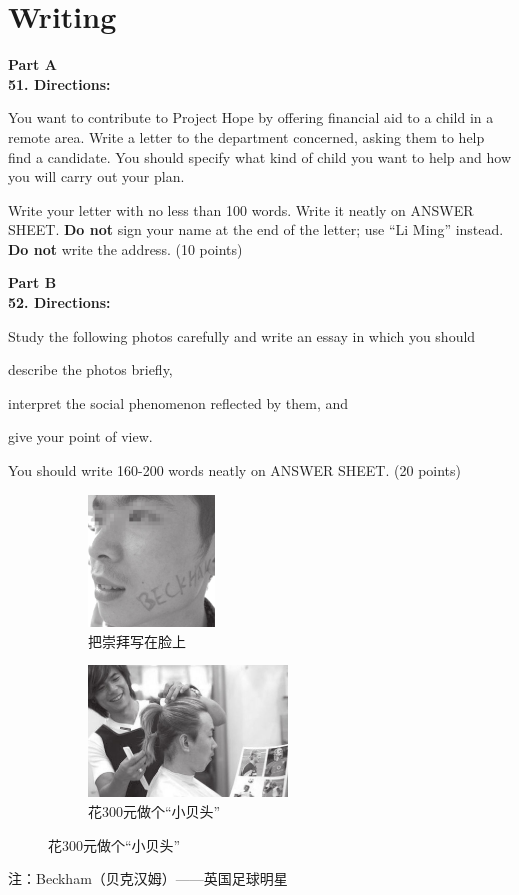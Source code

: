 \newpage
\section{Writing}


\noindent
\textbf{Part A}\\
\textbf{51. Directions:}

You want to contribute to Project Hope by offering financial aid to a
child in a remote area. Write a letter to the department concerned,
asking them to help find a candidate. You should specify what kind of
child you want to help and how you will carry out your plan.

Write your letter with no less than 100 words. Write it neatly on ANSWER
SHEET.
\textbf{Do not} sign your name at the end of the letter; use ``Li Ming''
instead.
\textbf{Do not} write the address. (10 points)


\vspace{2em}

\noindent
\textbf{Part B}\\
\textbf{52. Directions:}

Study the following photos carefully and write an essay in which you
should
\begin{listwrite}
	\item 
 describe the photos briefly,
\item
interpret the social phenomenon reflected by them, and
\item
give your point of view.
\end{listwrite}

You should write 160-200 words neatly on ANSWER SHEET. (20 points)




\begin{figure}[ht]
	\begin{subfigure}[b]{0.45\linewidth}
		\centering
		\includegraphics[height=3.5cm]{picture/2006_1.png}
		\caption*{把崇拜写在脸上}
	\end{subfigure}
\hfil
	\begin{subfigure}[b]{0.45\linewidth}
		\centering
		\includegraphics[height=3.5cm]{picture/2006_2.png} 
		\caption*{花300元做个“⼩贝头”}
		\label{fig:2}
	\end{subfigure}
\end{figure}


注：Beckham（贝克汉姆）——英国⾜球明星


\checkpagenumber

